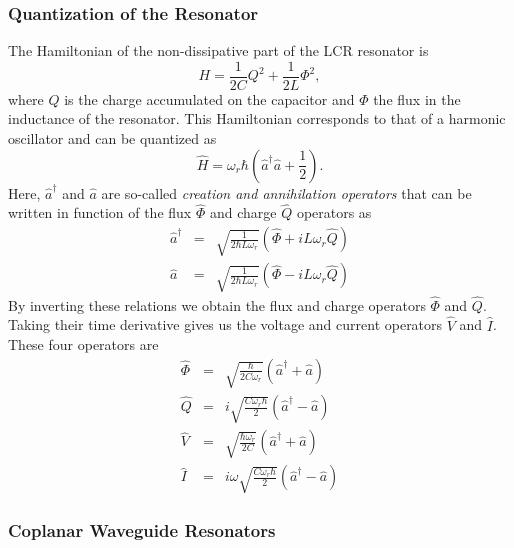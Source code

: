 \subsubsection{Quantization of the Resonator}

The Hamiltonian of the non-dissipative part of the LCR resonator is
%
\begin{equation}
H = \frac{1}{2C}Q^2+\frac{1}{2L}\Phi^2,
\end{equation}
%
where $Q$ is the charge accumulated on the capacitor and $\Phi$ the flux in the inductance of the resonator. This Hamiltonian corresponds to that of a harmonic oscillator and can be quantized as
%
\begin{equation}
\hat{H} = \omega_r\hbar\left(\hat{a}^\dagger\hat{a}+\frac{1}{2}\right). \label{eq:lc_hamiltonian}
\end{equation}
%
Here, $\hat{a}^\dagger$ and $\hat{a}$ are so-called {\it creation and annihilation operators} that can be written in function of the flux $\hat{\Phi}$ and charge $\hat{Q}$ operators as
%
\begin{eqnarray}
\hat{a}^\dagger & = & \sqrt{\frac{1}{2\hbar L \omega_r}}\left(\hat{\Phi}+iL\omega_r \hat{Q}\right)\\
\hat{a} & = & \sqrt{\frac{1}{2\hbar L\omega_r}}\left( \hat{\Phi}-iL\omega_r \hat{Q}\right)
\end{eqnarray}
%
By inverting these relations we obtain the flux and charge operators $\hat{\Phi}$ and $\hat{Q}$. Taking their time derivative gives us the voltage and current operators $\hat{V}$ and $\hat{I}$. These four operators are
%
\begin{eqnarray}
\hat{\Phi} & = & \sqrt{\frac{\hbar}{2C\omega_r}}\left(\hat{a}^\dagger+\hat{a}\right) \\
\hat{Q} & = & i\sqrt{\frac{C\omega_r\hbar}{2}}\left(\hat{a}^\dagger-\hat{a}\right) \\
\hat{V} & = & \sqrt{\frac{\hbar\omega_r}{2C}}\left(\hat{a}^\dagger+\hat{a}\right) \\
\hat{I} & = & i\omega\sqrt{\frac{C\omega_r\hbar}{2}}\left(\hat{a}^\dagger-\hat{a}\right)
\end{eqnarray}
%

\subsubsection{Coplanar Waveguide Resonators}

